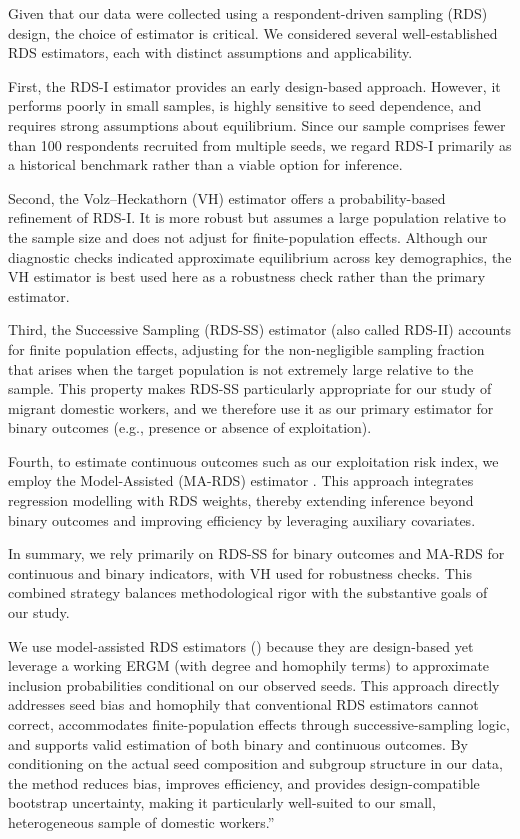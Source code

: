 \documentclass[
  12pt,
  letterpaper,
  DIV=11,
  numbers=noendperiod]{scrartcl}
\theoremstyle{plain}
\theoremstyle{definition}
\begin{document}
Given that our data were collected using a respondent-driven sampling
(RDS) design, the choice of estimator is critical. We considered several
well-established RDS estimators, each with distinct assumptions and
applicability.

First, the RDS-I estimator \textcite{salg04-sampling} provides an early
design-based approach. However, it performs poorly in small samples, is
highly sensitive to seed dependence, and requires strong assumptions
about equilibrium. Since our sample comprises fewer than 100 respondents
recruited from multiple seeds, we regard RDS-I primarily as a historical
benchmark rather than a viable option for inference.

Second, the Volz--Heckathorn (VH) estimator
\textcite{volz08-probability} offers a probability-based refinement of
RDS-I. It is more robust but assumes a large population relative to the
sample size and does not adjust for finite-population effects. Although
our diagnostic checks indicated approximate equilibrium across key
demographics, the VH estimator is best used here as a robustness check
rather than the primary estimator.

Third, the Successive Sampling (RDS-SS) estimator (also called RDS-II)
\textcite{gile11-improved} accounts for finite population effects,
adjusting for the non-negligible sampling fraction that arises when the
target population is not extremely large relative to the sample. This
property makes RDS-SS particularly appropriate for our study of migrant
domestic workers, and we therefore use it as our primary estimator for
binary outcomes (e.g., presence or absence of exploitation).

Fourth, to estimate continuous outcomes such as our exploitation risk
index, we employ the Model-Assisted (MA-RDS) estimator
\textcite{gile15-network}. This approach integrates regression modelling
with RDS weights, thereby extending inference beyond binary outcomes and
improving efficiency by leveraging auxiliary covariates.

In summary, we rely primarily on RDS-SS for binary outcomes and MA-RDS
for continuous and binary indicators, with VH used for robustness
checks. This combined strategy balances methodological rigor with the
substantive goals of our study.

We use model-assisted RDS estimators (\textcite{gile15-network}) because
they are design-based yet leverage a working ERGM (with degree and
homophily terms) to approximate inclusion probabilities conditional on
our observed seeds. This approach directly addresses seed bias and
homophily that conventional RDS estimators cannot correct, accommodates
finite-population effects through successive-sampling logic, and
supports valid estimation of both binary and continuous outcomes. By
conditioning on the actual seed composition and subgroup structure in
our data, the method reduces bias, improves efficiency, and provides
design-compatible bootstrap uncertainty, making it particularly
well-suited to our small, heterogeneous sample of domestic workers.''
\end{document}
